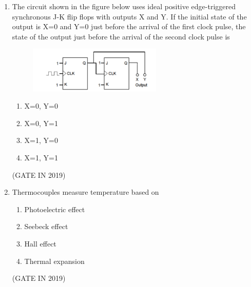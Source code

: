 \documentclass[journal]{IEEEtran}
\begin{document}
\begin{enumerate}
\item The circuit shown in the figure below uses ideal positive edge-triggered synchronous J-K flip flops with outputs X and Y. If the initial state of the output is X=0 and Y=0 just before the arrival of the first clock pulse, the state of the output just before the arrival of the second clock pulse is
\begin{figure}[H]
    \centering
    \includegraphics[width=0.6\textwidth]{4.png}
    \caption{}
    \label{fig:fig4}
\end{figure}
\begin{multicols}{2}
\begin{enumerate}
\item X=0, Y=0
\item X=0, Y=1
\item X=1, Y=0
\item X=1, Y=1
\end{enumerate}
\end{multicols} \hfill(GATE IN 2019)

\item Thermocouples measure temperature based on
\begin{multicols}{2}
\begin{enumerate}
\item Photoelectric effect
\item Seebeck effect
\item Hall effect
\item Thermal expansion
\end{enumerate}
\end{multicols} \hfill(GATE IN 2019)


\end{enumerate}
\end{document}
